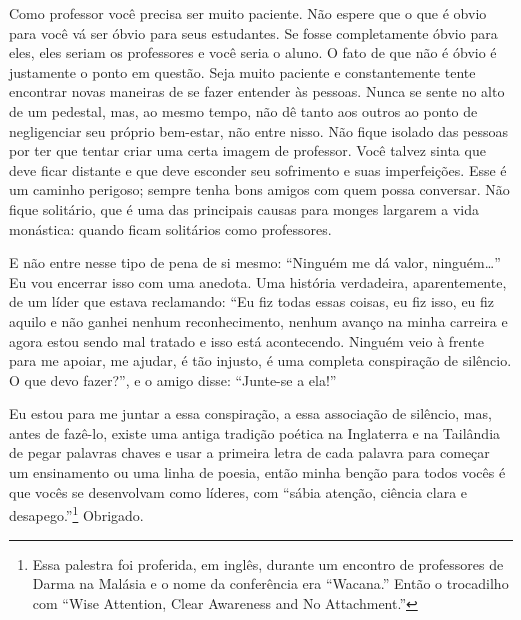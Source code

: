 Como professor você precisa ser muito paciente. Não espere que o que
é obvio para você vá ser óbvio para seus estudantes. Se fosse
completamente óbvio para eles, eles seriam os professores e você seria
o aluno. O fato de que não é óbvio é justamente o ponto em questão.
Seja muito paciente e constantemente tente encontrar novas maneiras de
se fazer entender às pessoas. Nunca se sente no alto de um pedestal,
mas, ao mesmo tempo, não dê tanto aos outros ao ponto de negligenciar
seu próprio bem-estar, não entre nisso. Não fique isolado das pessoas
por ter que tentar criar uma certa imagem de professor. Você talvez
sinta que deve ficar distante e que deve esconder seu sofrimento e suas
imperfeições. Esse é um caminho perigoso; sempre tenha bons amigos com
quem possa conversar. Não fique solitário, que é uma das principais
causas para monges largarem a vida monástica: quando ficam solitários
como professores. 

E não entre nesse tipo de pena de si mesmo: “Ninguém me dá valor,
ninguém\ldots{}” Eu vou encerrar isso com uma anedota. Uma história
verdadeira, aparentemente, de um líder que estava reclamando: “Eu fiz
todas essas coisas, eu fiz isso, eu fiz aquilo e não ganhei nenhum
reconhecimento, nenhum avanço na minha carreira e agora estou sendo mal
tratado e isso está acontecendo. Ninguém veio à frente para me apoiar,
me ajudar, é tão injusto, é uma completa conspiração de silêncio. O que
devo fazer?”, e o amigo disse: “Junte-se a ela!” 

Eu estou para me juntar a essa conspiração, a essa associação de
silêncio, mas, antes de fazê-lo, existe uma antiga tradição poética na
Inglaterra e na Tailândia de pegar palavras chaves e usar a primeira
letra de cada palavra para começar um ensinamento ou uma linha de
poesia, então minha benção para todos vocês é que vocês se desenvolvam
como líderes, com “sábia atenção, ciência clara e
desapego.”\footnote{Essa palestra foi proferida, em inglês, durante um
encontro de professores de Darma na Malásia e o nome da conferência era
“Wacana.” Então o trocadilho com “Wise Attention, Clear Awareness and
No Attachment.”} Obrigado. 
